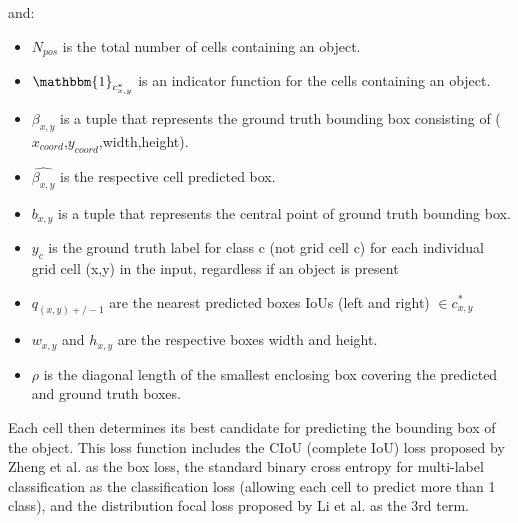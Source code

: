 \documentclass[10pt,twocolumn,letterpaper]{article}
\begin{document}
    
and:
\begin{itemize}
\item $N_{pos}$ is the total number of cells containing an object.
\item $\mathbbm{1}_{c^*_{x,y}}$ is an indicator function for the cells containing an object. 
\item $\beta_{x,y}$ is a tuple that represents the ground truth bounding box consisting of ($x_{coord}$,$y_{coord}$,width,height).
\item $\hat{\beta_{x,y}}$ is the respective cell predicted box.
\item $b_{x,y}$ is a tuple that represents the central point of ground truth bounding box.
\item $y_c$ is the ground truth label for class c (not grid cell c) for each individual grid cell (x,y) in the input, regardless if an object is present
\item $q_{(x,y)+/- 1}$ are the nearest predicted boxes IoUs (left and right) $\in c^*_{x,y}$
\item $w_{x,y}$ and $h_{x,y}$ are the respective boxes width and height.
\item $\rho$ is the diagonal length of the smallest enclosing box covering the predicted and ground truth boxes.
\end{itemize}

Each cell then determines its best candidate for predicting the bounding box of the object. This loss function includes the CIoU (complete IoU) loss proposed by Zheng et al.\cite{CIoU} as the box loss, the standard binary cross entropy for multi-label classification as the classification loss (allowing each cell to predict more than 1 class), and the distribution focal loss proposed by Li et al.\cite{GFL} as the 3rd term.
    
\end{document}
